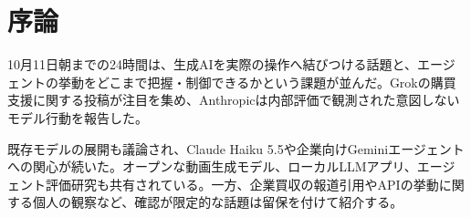 \section*{序論}
10月11日朝までの24時間は、生成AIを実際の操作へ結びつける話題と、エージェントの挙動をどこまで把握・制御できるかという課題が並んだ。Grokの購買支援に関する投稿が注目を集め、Anthropicは内部評価で観測された意図しないモデル行動を報告した。

既存モデルの展開も議論され、Claude Haiku 5.5や企業向けGeminiエージェントへの関心が続いた。オープンな動画生成モデル、ローカルLLMアプリ、エージェント評価研究も共有されている。一方、企業買収の報道引用やAPIの挙動に関する個人の観察など、確認が限定的な話題は留保を付けて紹介する。

